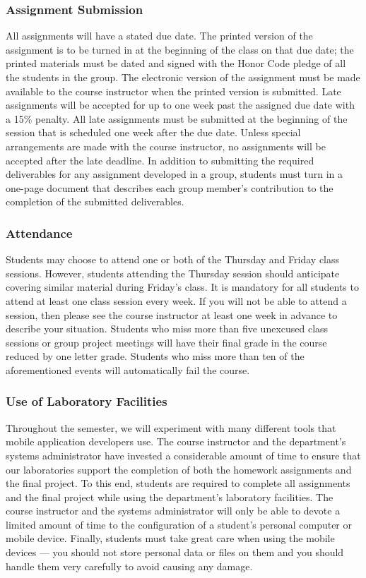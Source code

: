\subsubsection*{Assignment Submission}

All assignments will have a stated due date. The printed version of the assignment is to be turned in at the beginning
of the class on that due date; the printed materials must be dated and signed with the Honor Code pledge of all the
students in the group.  The electronic version of the assignment must be made available to the course instructor when
the printed version is submitted. Late assignments will be accepted for up to one week past the assigned due date with a
15\% penalty. All late assignments must be submitted at the beginning of the session that is scheduled one week after
the due date. Unless special arrangements are made with the course instructor, no assignments will be accepted after the
late deadline. In addition to submitting the required deliverables for any assignment developed in a group, students must
turn in a one-page document that describes each group member's contribution to the completion of the submitted deliverables.  

\subsubsection*{Attendance}

Students may choose to attend one or both of the Thursday and Friday class sessions.  However, students attending the
Thursday session should anticipate covering similar material during Friday's class.  It is mandatory for all students to
attend at least one class session every week. If you will not be able to attend a session, then please see the course
instructor at least one week in advance to describe your situation.  Students who miss more than five unexcused class
sessions or group project meetings will have their final grade in the course reduced by one letter grade.  Students who
miss more than ten of the aforementioned events will automatically fail the course.

\subsubsection*{Use of Laboratory Facilities}

Throughout the semester, we will experiment with many different tools that mobile application developers use.  The
course instructor and the department's systems administrator have invested a considerable amount of time to ensure that
our laboratories support the completion of both the homework assignments and the final project.  To this end, students
are required to complete all assignments and the final project while using the department's laboratory facilities. The
course instructor and the systems administrator will only be able to devote a limited amount of time to the
configuration of a student's personal computer or mobile device. Finally, students must take great care when using the
mobile devices --- you should not store personal data or files on them and you should handle them very carefully to avoid
causing any damage.

